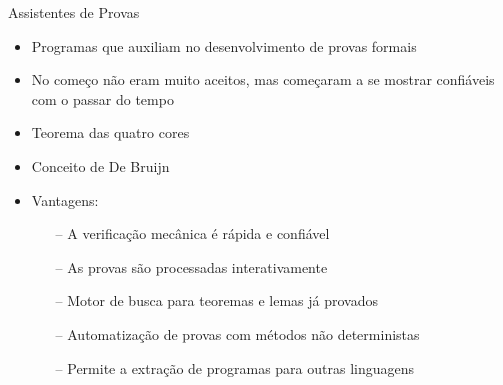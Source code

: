 \begin{frame}{Assistentes de Provas}
    \begin{itemize}
        \item Programas que auxiliam no desenvolvimento de provas formais \cite{silva2019certificaccao}
        \item No começo não eram muito aceitos, mas começaram a se mostrar confiáveis com o passar do tempo \cite{geuvers2009proof}
        \item Teorema das quatro cores
        \item Conceito de De Bruijn
        \item Vantagens:
        \begin{itemize}
            \item [--] A verificação mecânica é rápida e confiável
            \item [--] As provas são processadas interativamente
            \item [--] Motor de busca para teoremas e lemas já provados
            \item [--] Automatização de provas com métodos não deterministas
            \item [--] Permite a extração de programas para outras linguagens
        \end{itemize}
    \end{itemize}
\end{frame}